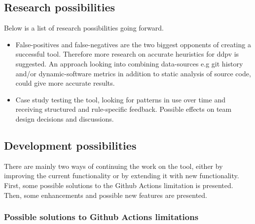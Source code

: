 \documentclass{report}
\begin{document}
 
\subsection{Research possibilities}
Below is a list of research possibilities going forward.

\begin{itemize}
    \item False-positives and false-negatives are the two biggest opponents of creating a successful tool. Therefore more research on accurate heuristics for \gls{ddpv} is suggested. An approach looking into combining data-sources e.g git history and/or dynamic-software metrics in addition to static analysis of source code, could give more accurate results. 

    \item Case study testing the tool, looking for patterns in use over time and receiving structured and rule-specific feedback. Possible effects on team design decisions and discussions.   
\end{itemize}


\subsection{Development possibilities}
There are mainly two ways of continuing the work on the tool, either by improving the current functionality or by extending it with new functionality. First, some possible solutions to the Github Actions limitation is presented. Then, some enhancements and possible new features are presented.


\subsubsection{Possible solutions to Github Actions limitations}
\end{document}
